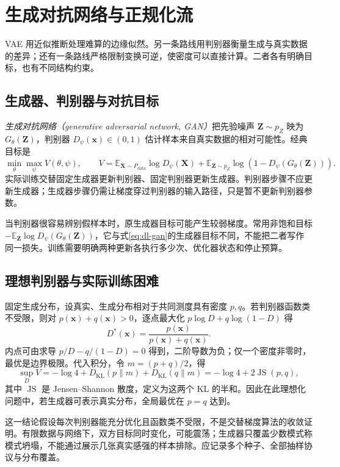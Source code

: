 \setcounter{chapter}{19} %
\chapter{生成对抗网络与正规化流}
\label{chap:dl-gan-flow}
VAE 用近似推断处理难算的边缘似然。另一条路线用判别器衡量生成与真实数据的差异；还有一条路线严格限制变换可逆，使密度可以直接计算。二者各有明确目标，也有不同结构约束。

\section{生成器、判别器与对抗目标}
\emph{生成对抗网络（generative adversarial network, GAN）}把先验噪声 $\mathbf Z\sim p_Z$ 映为 $G_\theta(\mathbf Z)$，判别器 $D_\psi(\mathbf x)\in(0,1)$ 估计样本来自真实数据的相对可能性。经典目标\cite{goodfellow2014}是
\begin{equation}
\min_\theta\max_\psi V(\theta,\psi),\qquad
V=\mathbb E_{\mathbf X\sim P_{\mathrm{data}}}\log D_\psi(\mathbf X)
+\mathbb E_{\mathbf Z\sim p_Z}\log(1-D_\psi(G_\theta(\mathbf Z))).
\label{eq:dl-gan}
\end{equation}
实际训练交替固定生成器更新判别器、固定判别器更新生成器。判别器步骤不应更新生成器；生成器步骤仍需让梯度穿过判别器的输入路径，只是暂不更新判别器参数。

当判别器很容易辨别假样本时，原生成器目标可能产生较弱梯度。常用非饱和目标 $-\mathbb E_{\mathbf Z}\log D_\psi(G_\theta(\mathbf Z))$，它与式\eqref{eq:dl-gan}的生成器目标不同，不能把二者写作同一损失。训练需要明确两种更新各执行多少次、优化器状态和停止预算。

\section{理想判别器与实际训练困难}
固定生成分布，设真实、生成分布相对于共同测度具有密度 $p,q$。若判别器函数类不受限，则对 $p(\mathbf x)+q(\mathbf x)>0$，逐点最大化 $p\log D+q\log(1-D)$ 得
\[
D^*(\mathbf x)=\frac{p(\mathbf x)}{p(\mathbf x)+q(\mathbf x)}.
\]
内点可由求导 $p/D-q/(1-D)=0$ 得到，二阶导数为负；仅一个密度非零时，最优是边界极限。代入积分，令 $m=(p+q)/2$，得
\[
\sup_DV=-\log4+D_{\mathrm{KL}}(p\|m)+D_{\mathrm{KL}}(q\|m)
=-\log4+2\operatorname{JS}(p,q),
\]
其中 $\operatorname{JS}$ 是 Jensen--Shannon 散度，定义为这两个 KL 的半和。因此在此理想化问题中，若生成器可表示真实分布，全局最优在 $p=q$ 达到。

这一结论假设每次判别器能充分优化且函数类不受限，不是交替梯度算法的收敛证明。有限数据与网络下，双方目标同时变化，可能震荡；生成器只覆盖少数模式称模式坍塌，不能通过展示几张真实感强的样本排除。应记录多个种子、全部抽样协议与分布覆盖。

